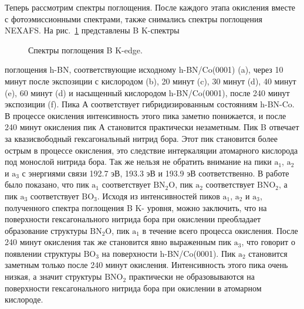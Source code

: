 Теперь рассмотрим спектры поглощения. После каждого этапа окисления вместе с фотоэмиссионными спектрами,
также снимались спектры поглощения NEXAFS. На рис.~\ref{pic:NEXAFS_B_K_edge} представлены B K-спектры
\begin{figure}[!ht]
\caption{Спектры поглощения B K-edge.}
\label{pic:NEXAFS_B_K_edge}
\end{figure}
поглощения h-BN, соответствующие исходному h-BN/Co(0001) (a), через 10 минут после экспозиции с кислородом (b), 
20 минут (c), 30 минут (d), 40 минут (e), 60 минут (d) и насыщенный кислородом h-BN/Co(0001), после 240 минут
экспозиции (f). Пика А соответствует гибридизированным состояниям h-BN-Co. В процессе окисления интенсивность
этого пика заметно понижается, и после 240 минут окисления пик А становится практически незаметным.
Пик B отвечает за квазисвободный гексагональный нитрид бора. Этот пик становится более острым в процессе 
окисления, это следствие интеркаляции атомарного кислорода под монослой нитрида бора. Так же нельзя не 
обратить внимание на пики $\mathrm{a_1}$, $\mathrm{a_2}$ и $\mathrm{a_3}$ с энергиями связи 192.7 эВ, 193.3 эВ 
и 193.9 эВ соответственно. В работе \cite{Huber2015_Oxy_Stab_defffects_in_hBN} было показано, что пик $\mathrm{a_1}$
соответствует $\mathrm{BN_2O}$, пик $\mathrm{a_2}$ соответствует $\mathrm{BNO_2}$, а пик $\mathrm{a_3}$ соответствует
$\mathrm{BO_3}$. Исходя из интенсивностей пиков $\mathrm{a_1}$, $\mathrm{a_2}$ и $\mathrm{a_3}$, полученного спектра
поглощения B K- уровня, можно заключить, что на поверхности гексагонального нитрида бора при окислении преобладает
образование структуры $\mathrm{BN_2O}$, пик $\mathrm{a_1}$ в течение всего процесса окисления. После 240 минут окисления
так же становится явно выраженным пик $\mathrm{a_3}$, что говорит о появлении структуры $\mathrm{BO_3}$ на поверхности 
h-BN/Co(0001). Пик $\mathrm{a_2}$ становится заметным только после 240 минут окисления. Интенсивность этого пика очень
низкая, а значит структуры $\mathrm{BNO_2}$ практически не образовываются на поверхности гексагонального нитрида бора
при окислении в атомарном кислороде.


\clearpage
